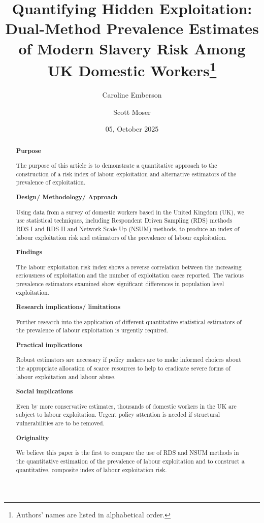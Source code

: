 \documentclass[
  12pt,
  letterpaper,
  DIV=11,
  numbers=noendperiod]{scrartcl}
\title{Quantifying Hidden Exploitation: Dual-Method Prevalence Estimates
of Modern Slavery Risk Among UK Domestic Workers\footnote{Authors' names
  are listed in alphabetical order.}}
\author{Caroline Emberson \and Scott Moser}
\date{05, October 2025}
\theoremstyle{plain}
\theoremstyle{definition}
\begin{document}
\maketitle
\begin{abstract}
\textbf{Purpose}

The purpose of this article is to demonstrate a quantitative approach to
the construction of a risk index of labour exploitation and alternative
estimators of the prevalence of exploitation.

\textbf{Design/ Methodology/ Approach}

Using data from a survey of domestic workers based in the United Kingdom
(UK), we use statistical techniques, including Respondent Driven
Sampling (RDS) methods RDS-I and RDS-II and Network Scale Up (NSUM)
methods, to produce an index of labour exploitation risk and estimators
of the prevalence of labour exploitation.

\textbf{Findings}

The labour exploitation risk index shows a reverse correlation between
the increasing seriousness of exploitation and the number of
exploitation cases reported. The various prevalence estimators examined
show significant differences in population level exploitation.

\textbf{Research implications/ limitations}

Further research into the application of different quantitative
statistical estimators of the prevalence of labour exploitation is
urgently required.

\textbf{Practical implications}

Robust estimators are necessary if policy makers are to make informed
choices about the appropriate allocation of scarce resources to help to
eradicate severe forms of labour exploitation and labour abuse.

\textbf{Social implications}

Even by more conservative estimates, thousands of domestic workers in
the UK are subject to labour exploitation. Urgent policy attention is
needed if structural vulnerabilities are to be removed.

\textbf{Originality}

We believe this paper is the first to compare the use of RDS and NSUM
methods in the quantitative estimation of the prevalence of labour
exploitation and to construct a quantitative, composite index of labour
exploitation risk.
\end{abstract}
\end{document}
